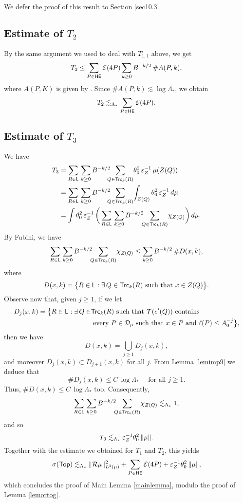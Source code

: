 We defer the proof of this result to Section \ref{sec10.3}.



\vv

\subsection{Estimate of \texorpdfstring{$T_2$}{T2}}

By the same argument we used to deal with $T_{1,1}$ above, we get
$$T_2
 \leq
\sum_{P\in {\mathsf {HE}}} {\mathcal E}(4P)
 \sum_{k\geq0} B^{-k/2}\,
\# A(P,k),
$$
where $A(P,K)$ is given by .
Since $\#A(P,k)\lesssim\log\Lambda_*$, we obtain
$$T_2
 \lesssim_{\Lambda_*}
\sum_{P\in {\mathsf {HE}}} {\mathcal E}(4P).$$




\vv

\subsection{Estimate of \texorpdfstring{$T_3$}{T3}}

We have
\begin{align*}
T_3 & = \sum_{R\in\sL}\,
\sum_{k\geq0} B^{-k/2} \!\!\!\!\sum_{Q\in\Trc_k(R)}\!
\theta_0^2\,\ve_Z^{-1}\,\mu(Z(Q))\\
& =
\sum_{R\in\sL}\,
\sum_{k\geq0} B^{-k/2} \!\!\!\!\sum_{Q\in\Trc_k(R)}\!
\int_{Z(Q)}\theta_0^2\,\ve_Z^{-1}\,d\mu\\
&= \int\theta_0^2\,\ve_Z^{-1}\, \bigg(\sum_{R\in\sL}\,\sum_{k\geq0} B^{-k/2}\!\!\!
\sum_{Q\in\Trc_k(R)}\!\chi_{Z(Q)}\bigg)\,d\mu.
\end{align*}
By Fubini, we have
$$\sum_{R\in{\mathsf{L}}}\,\sum_{k\geq0} B^{-k/2}\!\!\!
\sum_{Q\in{\mathsf{Trc}}_k(R)}\!\chi_{Z(Q)} \leq \sum_{k\geq0} B^{-k/2} \,\# D(x,k),$$
where
$$D(x,k) = 
\big\{R\in {\mathsf{L}}:\exists \,Q\in{\mathsf{Trc}}_k(R) \text{ such that }x\in Z(Q)\big\}.
$$
Observe now that, given $j\ge1$, if we let
\begin{align*}D_j(x,k) = 
\big\{R\in {\mathsf{L}}: \exists \,Q\in&{\mathsf{Trc}}_k(R) \text{ such that ${\mathcal T}(e'(Q))$ contains} \\
&\text{
every $P\in{\mathcal D}_\mu$ such that $x\in P$ and $\ell(P)\leq A_0^{-j}$}\big\},
\end{align*}
then we have
$$D(x,k) = \bigcup_{j\geq 1} D_j(x,k),$$
and moreover $D_j(x,k)\subset D_{j+1}(x,k)$ for all $j$.
From Lemma \ref{lemimp9} we deduce that
$$\#D_j(x,k)\leq C\,\log\Lambda_*\quad \mbox{ for all $j\geq 1$.}$$
Thus, $\#D(x,k)\leq C\,\log\Lambda_*$ too. Consequently,
$$\sum_{R\in{\mathsf{L}}}\,\sum_{k\geq0} B^{-k/2}\!\!\!
\sum_{Q\in{\mathsf{Trc}}_k(R)}\!\chi_{Z(Q)} \lesssim_{\Lambda_*} 1,$$
and so
$$T_3\lesssim_{\Lambda_*} {\varepsilon}_Z^{-1}
\theta_0^2\,\|\mu\|.$$
Together with the estimate we obtained for $T_1$ and $T_2$, this yields
$$\sigma({\mathsf {Top}})\lesssim_{\Lambda_*} \|{\mathcal R}\mu\|_{L^2(\mu)}^2 + \sum_{P\in {\mathsf {HE}}} {\mathcal E}(4P)+ {\varepsilon}_Z^{-1}
\theta_0^2\,\|\mu\|,$$
which concludes the proof of Main Lemma \ref{mainlemma}, modulo the proof of Lemma \ref{lemortog}.
\vv

